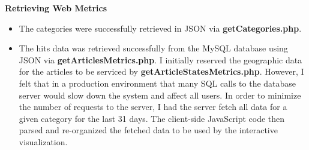 \documentclass[12pt]{article}
\begin{document}
{\newpage

\noindent\textbf{Retrieving Web Metrics} 
\begin{itemize}
\item The categories were successfully retrieved in JSON via \textbf{getCategories.php}.
\item The hits data was retrieved successfully from the MySQL database using JSON via \textbf{getArticlesMetrics.php}. I initially reserved the geographic data for the articles to be serviced by \textbf{getArticleStatesMetrics.php}. However, I felt that in a production environment that many SQL calls to the database server would slow down the system and affect all users. In order to minimize the number of requests to the server, I had the server fetch all data for a given category for the last 31 days. The client-side JavaScript code then parsed and re-organized the fetched data to be used by the interactive visualization.
\end{itemize}

\vspace{0.2in}

}
\end{document}
